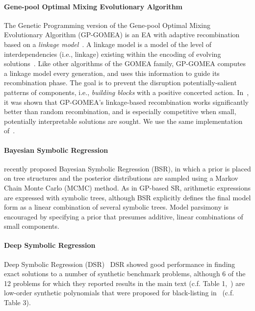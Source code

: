 \paragraph{Gene-pool Optimal Mixing Evolutionary Algorithm}

The Genetic Programming version of the Gene-pool Optimal Mixing Evolutionary Algorithm (GP-GOMEA) is an EA with adaptive recombination based on a \emph{linkage model}~\cite{virgolin2017scalable,virgolin2020improving}. 
A linkage model is a model of the level of interdependencies (i.e., linkage) existing within the encoding of evolving solutions~\cite{thierens2011optimal}. 
Like other algorithms of the GOMEA family, GP-GOMEA computes a linkage model every generation, and uses this information to guide its recombination phase. 
The goal is to prevent the disruption potentially-salient patterns of components, i.e., \emph{building blocks} with a positive concerted action.
In~\cite{virgolin2017scalable,virgolin2020improving}, it was shown that GP-GOMEA’s linkage-based recombination works significantly better than random recombination, and is especially competitive when small, potentially interpretable solutions are sought. 
We use the same implementation of~\cite{virgolin2020improving}.

\paragraph{Bayesian Symbolic Regression}

\citet{jinBayesianSymbolicRegression2020} recently proposed Bayesian Symbolic Regression (BSR), in which a prior is placed on tree structures and the posterior distributions are sampled using a Markov Chain Monte Carlo (MCMC) method.   
As in GP-based SR, arithmetic expressions are expressed with symbolic trees, although BSR explicitly defines the final model form as a linear combination of several symbolic trees. 
Model parsimony is encouraged by specifying a prior that presumes additive, linear combinations of small components. 

\paragraph{Deep Symbolic Regression}
Deep Symbolic Regression (DSR)~\cite{petersenDeepSymbolicRegression2020} 
DSR showed good performance in finding exact solutions to a number of synthetic benchmark problems, although 6 of the 12 problems for which they reported results in the main text (c.f. Table 1,~\cite{petersenDeepSymbolicRegression2020}) are low-order synthetic polynomials that were proposed for black-listing in~\citet{whiteBetterGPBenchmarks2012a} (c.f. Table 3).  


